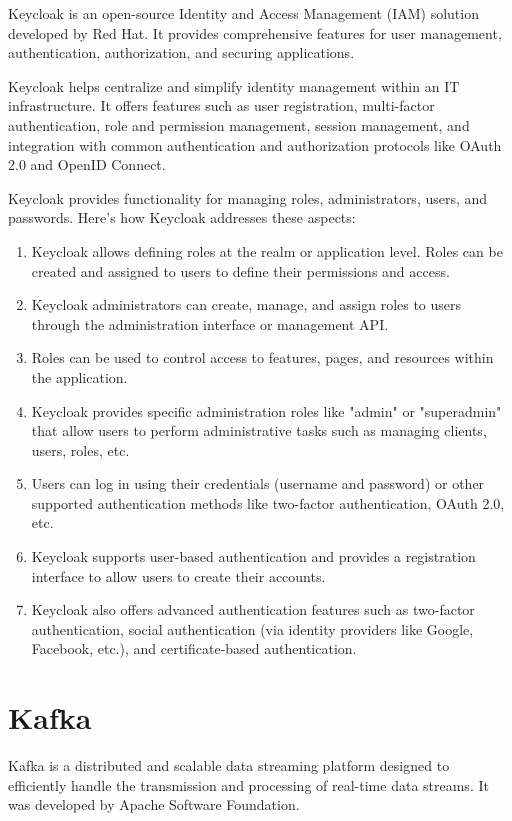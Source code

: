 Keycloak is an open-source Identity and Access Management (IAM) solution developed by Red Hat. It provides comprehensive features for user management, authentication, authorization, and securing applications.

Keycloak helps centralize and simplify identity management within an IT infrastructure. It offers features such as user registration, multi-factor authentication, role and permission management, session management, and integration with common authentication and authorization protocols like OAuth 2.0 and OpenID Connect.

Keycloak provides functionality for managing roles, administrators, users, and passwords. Here's how Keycloak addresses these aspects:

\begin{enumerate}
\item Keycloak allows defining roles at the realm or application level. Roles can be created and assigned to users to define their permissions and access.
\item Keycloak administrators can create, manage, and assign roles to users through the administration interface or management API.
\item Roles can be used to control access to features, pages, and resources within the application.
\item Keycloak provides specific administration roles like "admin" or "superadmin" that allow users to perform administrative tasks such as managing clients, users, roles, etc.
\item Users can log in using their credentials (username and password) or other supported authentication methods like two-factor authentication, OAuth 2.0, etc.
\item Keycloak supports user-based authentication and provides a registration interface to allow users to create their accounts.
\item Keycloak also offers advanced authentication features such as two-factor authentication, social authentication (via identity providers like Google, Facebook, etc.), and certificate-based authentication.
\end{enumerate}

\section{Kafka}

Kafka is a distributed and scalable data streaming platform designed to efficiently handle the transmission and processing of real-time data streams. It was developed by Apache Software Foundation.

